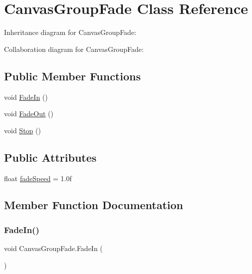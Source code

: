 \hypertarget{class_canvas_group_fade}{}\section{Canvas\+Group\+Fade Class Reference}
\label{class_canvas_group_fade}


Inheritance diagram for Canvas\+Group\+Fade\+:


Collaboration diagram for Canvas\+Group\+Fade\+:
\subsection*{Public Member Functions}
\begin{DoxyCompactItemize}
\item 
void \hyperlink{class_canvas_group_fade_aa05b228f774bb53aed47886c729b71fd}{Fade\+In} ()
\item 
void \hyperlink{class_canvas_group_fade_a80dceb19ea1925d62e8eec5d9d41c498}{Fade\+Out} ()
\item 
void \hyperlink{class_canvas_group_fade_a262fee68d7b7f75b31ad036a0cc5a0e2}{Stop} ()
\end{DoxyCompactItemize}
\subsection*{Public Attributes}
\begin{DoxyCompactItemize}
\item 
float \hyperlink{class_canvas_group_fade_a7eea4c7216b60867b3d24ffaf023257e}{fade\+Speed} = 1.\+0f
\end{DoxyCompactItemize}


\subsection{Member Function Documentation}
\mbox{\label{class_canvas_group_fade_aa05b228f774bb53aed47886c729b71fd}} 
\subsubsection{\texorpdfstring{Fade\+In()}{FadeIn()}}
{\footnotesize\ttfamily void Canvas\+Group\+Fade.\+Fade\+In (\begin{DoxyParamCaption}{ }\end{DoxyParamCaption})\hspace{0.3cm}{\ttfamily [inline]}}

